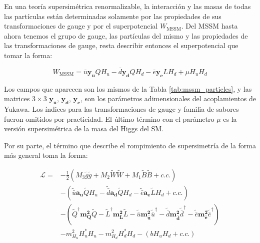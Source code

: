 En una teoría supersimétrica renormalizable, la interacción y las masas de todas las partículas están determinadas solamente por las propiedades de sus transformaciones de gauge y por el superpotencial $W_{\text{MSSM}}$. Del MSSM hasta ahora tenemos el grupo de gauge, las partículas del mismo y las propiedades de las transformaciones de gauge, resta describir entonces el superpotencial que tomar la forma:

\begin{equation}
	W_{\text{MSSM}} = \bar{u}\textbf{y}_\textbf{u}QH_u - \bar{d}\textbf{y}_\textbf{d}QH_d - \bar{e}\textbf{y}_\textbf{e}LH_d + \mu H_u H_d
	\label{eq:susy_potential}
\end{equation}

Los campos que aparecen son los mismos de la Tabla \ref{tab:mssm_particles}, y las matrices $3\times3$ $\textbf{y}_\textbf{u}$, $\textbf{y}_\textbf{d}$, $\textbf{y}_\textbf{e}$, son los parámetros adimensionales del acoplamientos de Yukawa. Los índices para las transformaciones de gauge y familia de sabores fueron omitidos por practicidad. El último término con el parámetro $\mu$ es la versión supersimétrica de la masa del Higgs del SM.

Por su parte, el término que describe el rompimiento de supersimetría de la forma más general toma la forma:

\begin{equation}
	\begin{split}
		\mathcal{L} = & -\frac{1}{2}\left( M_3 \tilde{g}\tilde{g} + M_2 \widetilde{W}\widetilde{W} + M_1 \widetilde{B}\widetilde{B} + c.c. \right) \\
			& - \left( \tilde{\bar{u}}\textbf{a}_\textbf{u}\widetilde{Q}H_u -  \tilde{\bar{d}}\textbf{a}_\textbf{d}\widetilde{Q}H_d -  \tilde{\bar{e}}\textbf{a}_\textbf{e}\widetilde{L}H_d + c.c. \right) \\
			& - \left( \tilde{Q}^{\dagger} \textbf{m}_{\textbf{Q}}^{\textbf{2}}\tilde{Q} - \tilde{L}^{\dagger}\textbf{m}_{\textbf{L}}^{\textbf{2}}\tilde{L} - \tilde{\bar{u}}\textbf{m}_{\bar{\textbf{u}}}^{\textbf{2}}\tilde{\bar{u}}^{\dagger} - \tilde{\bar{d}}\textbf{m}_{\bar{\textbf{d}}}^{\textbf{2}}\tilde{\bar{d}}^{\dagger} - \tilde{\bar{e}}\textbf{m}_{\bar{\textbf{e}}}^{\textbf{2}}\tilde{\bar{e}}^{\dagger} \right) \\
			& - m_{H_u}^2 H_u^* H_u - m_{H_d}^2 H_d^* H_d - (b H_u H_d + c.c.) \\
	\end{split}
\end{equation}

